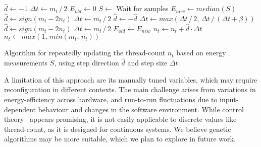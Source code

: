 \begin{algorithm}[!ht]
    \begin{algorithmic}[1]
            \State $\hat{d} \gets -1$
            \State $\Delta t \gets m_t\, /\, 2$
            \State $E_{old} \gets 0$
            \Loop
                \State $S \gets$ Wait for samples
                \State $E_{new} \gets median(S)$
                    \State $\hat{d} \gets sign(m_t - 2 n_t)$
                    \State $\Delta t \gets m_t\, /\, 2$
                \Else
                        \State $\hat{d} \gets -\hat{d}$
                    \EndIf
                        \State $\Delta t \gets max(\Delta t\, /\, 2,\, \Delta t\, /\, (\Delta t + \beta))$
                    \Else
                        \State $\hat{d} \gets sign(m_t - 2 n_t)$
                        \State $\Delta t \gets m_t\, /\, 2$
                    \EndIf
                \EndIf
                \State $E_{old} \gets E_{new}$
                \State $n_t \gets n_t + \hat{d} \cdot \Delta t$
                \State $n_t \gets max(1,\, min(m_t,\, n_t))$
            \EndLoop
    \end{algorithmic}%
    \caption{Algorithm for repeatedly updating the thread-count $n_t$ based on energy measurements
    $S$, using step direction $\hat{d}$ and step size $\Delta t$.}
    \label{alg:controller}
\end{algorithm}

A limitation of this approach are its manually tuned variables, which may require reconfiguration in
different contexts. The main challenge arises from variations in energy-efficiency across hardware,
and run-to-run fluctuations due to input-dependent behaviour and changes in the software
environment. While control theory~\cite{control-theory} appears promising, it is not easily
applicable to discrete values like thread-count, as it is designed for continuous systems. We
believe genetic algorithms may be more suitable, which we plan to explore in future work.
